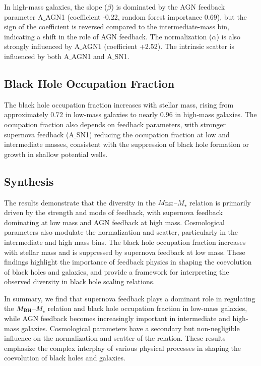\documentclass[twocolumn]{aastex631}
\begin{document}
In high-mass galaxies, the slope ($\beta$) is dominated by the AGN feedback parameter A\ensuremath{\_}{AGN1} (coefficient -0.22, random forest importance 0.69), but the sign of the coefficient is reversed compared to the intermediate-mass bin, indicating a shift in the role of AGN feedback. The normalization ($\alpha$) is also strongly influenced by A\ensuremath{\_}{AGN1} (coefficient +2.52). The intrinsic scatter is influenced by both A\ensuremath{\_}{AGN1} and A\ensuremath{\_}{SN1}.

\subsection{Black Hole Occupation Fraction}

The black hole occupation fraction increases with stellar mass, rising from approximately 0.72 in low-mass galaxies to nearly 0.96 in high-mass galaxies. The occupation fraction also depends on feedback parameters, with stronger supernova feedback (A\ensuremath{\_}{SN1}) reducing the occupation fraction at low and intermediate masses, consistent with the suppression of black hole formation or growth in shallow potential wells.

\subsection{Synthesis}

The results demonstrate that the diversity in the $M_{\rm BH}$--$M_{\star}$ relation is primarily driven by the strength and mode of feedback, with supernova feedback dominating at low mass and AGN feedback at high mass. Cosmological parameters also modulate the normalization and scatter, particularly in the intermediate and high mass bins. The black hole occupation fraction increases with stellar mass and is suppressed by supernova feedback at low mass. These findings highlight the importance of feedback physics in shaping the coevolution of black holes and galaxies, and provide a framework for interpreting the observed diversity in black hole scaling relations.

In summary, we find that supernova feedback plays a dominant role in regulating the $M_{\rm BH}$--$M_{\star}$ relation and black hole occupation fraction in low-mass galaxies, while AGN feedback becomes increasingly important in intermediate and high-mass galaxies. Cosmological parameters have a secondary but non-negligible influence on the normalization and scatter of the relation. These results emphasize the complex interplay of various physical processes in shaping the coevolution of black holes and galaxies.
\end{document}
